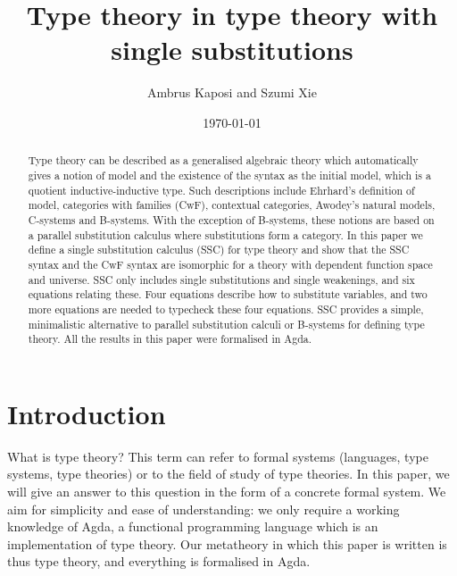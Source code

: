 \documentclass[a4paper]{article}
\begin{document}
\title{Type theory in type theory with single substitutions}
\author{Ambrus Kaposi and Szumi Xie}
\date{\today}
\maketitle

\begin{abstract}
Type theory can be described as a generalised algebraic theory which
automatically gives a notion of model and the existence of the syntax
as the initial model, which is a quotient inductive-inductive
type. Such descriptions include Ehrhard's definition of model,
categories with families (CwF), contextual categories, Awodey's
natural models, C-systems and B-systems. With the exception of
B-systems, these notions are based on a parallel substitution calculus
where substitutions form a category. In this paper we define a single
substitution calculus (SSC) for type theory and show that the SSC
syntax and the CwF syntax are isomorphic for a theory with dependent
function space and universe. SSC only includes single substitutions
and single weakenings, and six equations relating these. Four
equations describe how to substitute variables, and two more equations
are needed to typecheck these four equations. SSC provides a simple,
minimalistic alternative to parallel substitution calculi or B-systems
for defining type theory. All the results in this paper were
formalised in Agda.
\end{abstract}

\section{Introduction}

\cite{singleTypes}
\cite{coquandEhrhard}

What is type theory? This term can refer to formal systems (languages,
type systems, type theories) or to the field of study of type
theories. In this paper, we will give an answer to this question in
the form of a concrete formal system. We aim for simplicity and ease
of understanding: we only require a working knowledge of Agda, a
functional programming language which is an implementation of type
theory. Our metatheory in which this paper is written is thus type
theory, and everything is formalised in Agda.
\end{document}
